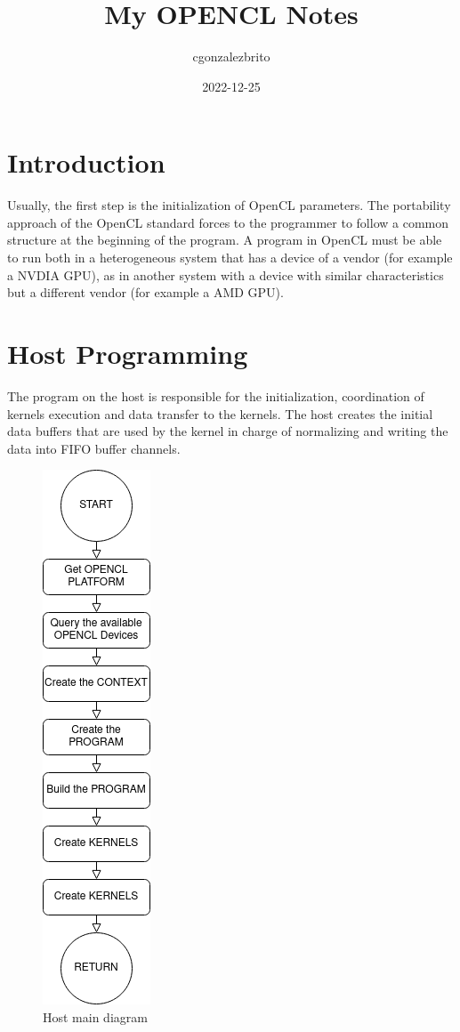 \documentclass{article}
\title{My OPENCL Notes}
\date{2022-12-25}
\author{cgonzalezbrito}
\begin{document}
  \maketitle
  \newpage
  \section{Introduction}
  

  Usually, the first step is the initialization of OpenCL parameters. The portability approach of the OpenCL standard forces to the programmer to follow a common structure at the beginning of the program. A program in OpenCL must be able to run both in a heterogeneous system that has a device of a vendor (for example a NVDIA GPU), as in another system with a device with similar characteristics but a different vendor (for example a AMD GPU).

  \newpage
  \section{Host Programming}
  
  The program on the host is responsible for the initialization, coordination of kernels execution and data transfer to the kernels. The host creates the initial data buffers that are used by the kernel in charge of normalizing and writing the data into FIFO buffer channels.
  \begin{figure}[h!]
    \includegraphics[width=0.2\linewidth]{images/host_diagram.png}
    \centering
    \caption{Host main diagram}
    \label{Fig 1:Host functions main diagram}
  \end{figure}
\end{document}

